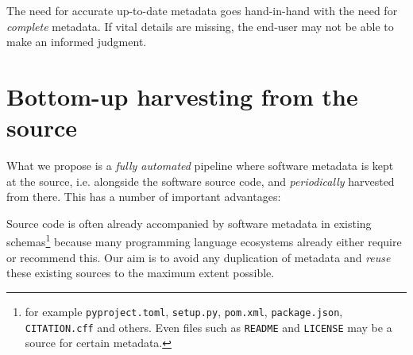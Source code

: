 \documentclass[a4paper,11pt]{article}
\begin{document}
The need for accurate up-to-date metadata goes hand-in-hand with the need for
\emph{complete} metadata. If vital details are missing, the
end-user may not be able to make an informed judgment.


\section{Bottom-up harvesting from the source}

What we propose is a \emph{fully automated} pipeline where software metadata is
kept at the source, i.e. alongside the software source code, and \emph{periodically} harvested from there. This has a number of important advantages: 



Source code is often already accompanied by software metadata in existing
schemas\footnote{for example \texttt{pyproject.toml}, \texttt{setup.py}, \texttt{pom.xml}, \texttt{package.json}, \texttt{CITATION.cff} and others. Even files such as \texttt{README} and \texttt{LICENSE} may be a source for certain metadata.} because many programming language ecosystems already either require or
recommend this. Our aim is to avoid any duplication of metadata and
\emph{reuse} these existing sources to the maximum extent possible.

\end{document}
